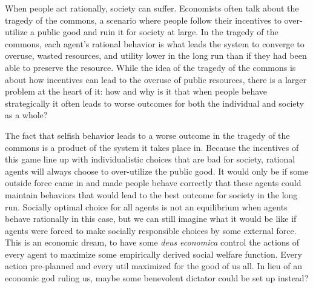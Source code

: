 \documentclass[12pt,twoside]{reedthesis}
\begin{document}
\doublespacing

When people act rationally, society can suffer. Economists often talk about the tragedy of the commons, a scenario where people follow their incentives to over-utilize a public good and ruin it for society at large. In the tragedy of the commons, each agent's rational behavior is what leads the system to converge to overuse, wasted resources, and utility lower in the long run than if they had been able to preserve the resource. While the idea of the tragedy of the commons is about how incentives can lead to the overuse of public resources, there is a larger problem at the heart of it: how and why is it that when people behave strategically it often leads to worse outcomes for both the individual and society as a whole? 

The fact that selfish behavior leads to a worse outcome in the tragedy of the commons is a product of the system it takes place in. Because the incentives of this game line up with individualistic choices that are bad for society, rational agents will always choose to over-utilize the public good. It would only be if some outside force came in and made people behave correctly that these agents could maintain behaviors that would lead to the best outcome for society in the long run. Socially optimal choice for all agents is not an equilibrium when agents behave rationally in this case, but we can still imagine what it would be like if agents were forced to make socially responsible choices by some external force. This is an economic dream, to have some {\em deus economica} control the actions of every agent to maximize some empirically derived social welfare function. Every action pre-planned and every util maximized for the good of us all. In lieu of an economic god ruling us, maybe some benevolent dictator could be set up instead? 
\end{document}
